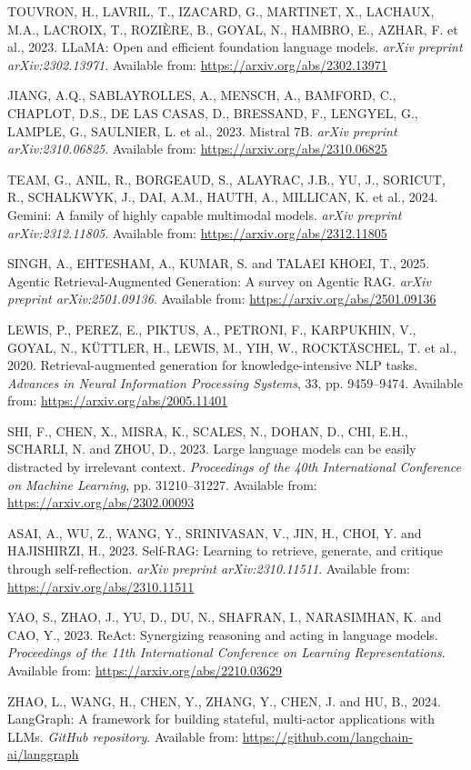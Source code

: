 \documentclass[12pt,a4paper]{article}
\begin{document}
TOUVRON, H., LAVRIL, T., IZACARD, G., MARTINET, X., LACHAUX, M.A., LACROIX, T., ROZIÈRE, B., GOYAL, N., HAMBRO, E., AZHAR, F. et al., 2023. LLaMA: Open and efficient foundation language models. \textit{arXiv preprint arXiv:2302.13971}. Available from: \url{https://arxiv.org/abs/2302.13971}

JIANG, A.Q., SABLAYROLLES, A., MENSCH, A., BAMFORD, C., CHAPLOT, D.S., DE LAS CASAS, D., BRESSAND, F., LENGYEL, G., LAMPLE, G., SAULNIER, L. et al., 2023. Mistral 7B. \textit{arXiv preprint arXiv:2310.06825}. Available from: \url{https://arxiv.org/abs/2310.06825}

TEAM, G., ANIL, R., BORGEAUD, S., ALAYRAC, J.B., YU, J., SORICUT, R., SCHALKWYK, J., DAI, A.M., HAUTH, A., MILLICAN, K. et al., 2024. Gemini: A family of highly capable multimodal models. \textit{arXiv preprint arXiv:2312.11805}. Available from: \url{https://arxiv.org/abs/2312.11805}

SINGH, A., EHTESHAM, A., KUMAR, S. and TALAEI KHOEI, T., 2025. Agentic Retrieval-Augmented Generation: A survey on Agentic RAG. \textit{arXiv preprint arXiv:2501.09136}. Available from: \url{https://arxiv.org/abs/2501.09136}

LEWIS, P., PEREZ, E., PIKTUS, A., PETRONI, F., KARPUKHIN, V., GOYAL, N., KÜTTLER, H., LEWIS, M., YIH, W., ROCKTÄSCHEL, T. et al., 2020. Retrieval-augmented generation for knowledge-intensive NLP tasks. \textit{Advances in Neural Information Processing Systems}, 33, pp. 9459--9474. Available from: \url{https://arxiv.org/abs/2005.11401}

SHI, F., CHEN, X., MISRA, K., SCALES, N., DOHAN, D., CHI, E.H., SCHARLI, N. and ZHOU, D., 2023. Large language models can be easily distracted by irrelevant context. \textit{Proceedings of the 40th International Conference on Machine Learning}, pp. 31210--31227. Available from: \url{https://arxiv.org/abs/2302.00093}

ASAI, A., WU, Z., WANG, Y., SRINIVASAN, V., JIN, H., CHOI, Y. and HAJISHIRZI, H., 2023. Self-RAG: Learning to retrieve, generate, and critique through self-reflection. \textit{arXiv preprint arXiv:2310.11511}. Available from: \url{https://arxiv.org/abs/2310.11511}

YAO, S., ZHAO, J., YU, D., DU, N., SHAFRAN, I., NARASIMHAN, K. and CAO, Y., 2023. ReAct: Synergizing reasoning and acting in language models. \textit{Proceedings of the 11th International Conference on Learning Representations}. Available from: \url{https://arxiv.org/abs/2210.03629}

ZHAO, L., WANG, H., CHEN, Y., ZHANG, Y., CHEN, J. and HU, B., 2024. LangGraph: A framework for building stateful, multi-actor applications with LLMs. \textit{GitHub repository}. Available from: \url{https://github.com/langchain-ai/langgraph}
\end{document}
